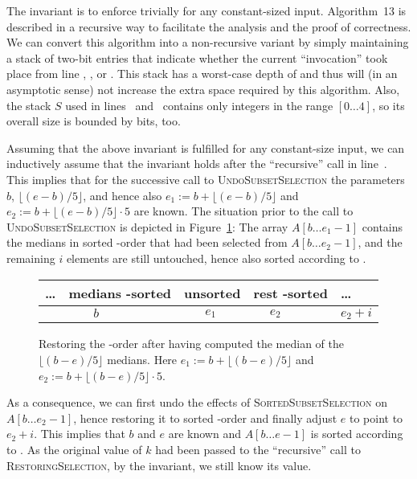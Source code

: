The invariant is to enforce trivially for any constant-sized input. 
Algorithm~13 is described in a recursive way to facilitate the 
analysis and the proof of correctness. We can convert this algorithm 
into a non-recursive variant by simply maintaining a stack of 
two-bit entries that indicate whether the current ``invocation'' took 
place from line \theSelectA, \theSelectB, or \theSelectC. This stack 
has a worst-case depth of  and thus will (in an asymptotic 
sense) not increase the extra space required by this algorithm. 
Also, the stack $S$ used in lines \theStackA\ and \theStackB\ 
contains only integers in the range $[0\ldots 4]$, so its overall 
size is bounded by \Oh{\log n} bits,
too. 

Assuming that the above invariant is fulfilled for any constant-size
input, we can inductively assume that the invariant holds after the
``recursive'' call in line~\theSelectA. This implies that for the
successive call to \textsc{UndoSubsetSelection} the parameters $b$,
$\lfloor(e-b)/5\rfloor$, and hence also $e_1:=b+\lfloor(e-b)/5\rfloor$
and $e_2:=b+\lfloor(e-b)/5\rfloor\cdot 5$ are known. The situation
prior to the call to \textsc{UndoSubsetSelection} is depicted in
Figure~\ref{fig:undomedian}: The array ${A}[b\ldots e_1-1]$
contains the medians in sorted \LA-order that had been
selected from ${A}[b\ldots e_2-1]$, and the remaining $i$
elements are still untouched, hence also sorted according to
\LA. 

\begin{figure}[ht]
  \renewcommand{\arraystretch}{1.75}
  \begin{center}
  \begin{tabular}{cccrrcrl}
    \hline
    \ldots & 
    \multicolumn{2}{|c|}{medians \LA-sorted} &
    \multicolumn{2}{c|}{unsorted} &
    \multicolumn{2}{c|}{rest \LA-sorted} & 
    \ldots \\
    \hline 
    &
    {\small $b$} &
    &
    {\small $e_1$} & 
    &
    {\small $e_2$} & 
    &
    {\small $e_2+i$} 
  \end{tabular}
  \end{center}
  \caption{Restoring the \LA-order after having computed
    the median of the $\lfloor(b-e)/5\rfloor$ medians. 
    Here $e_1:= b + \lfloor(b-e)/5\rfloor$ and  
    $e_2:= b + \lfloor(b-e)/5\rfloor \cdot 5$.}
  \label{fig:undomedian}
\end{figure}

As a consequence, we can first undo the effects of
\textsc{SortedSubsetSelection} on ${A}[b\ldots e_2 -1]$, hence
restoring it to sorted \LA-order and finally adjust $e$
to point to $e_2 + i$. This implies that $b$ and $e$ are known and
${A}[b\ldots e-1]$ is sorted according to \LA. As the original
value of $k$ had been passed to the ``recursive'' call to
\textsc{RestoringSelection}, by the invariant, we still know its value.


